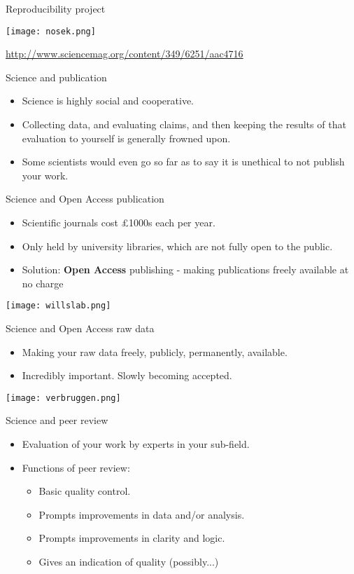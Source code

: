 \documentclass{beamer}
\begin{document}
\begin{frame}{Reproducibility project}
	\centerline{\texttt{[image: nosek.png]}}
	\url{http://www.sciencemag.org/content/349/6251/aac4716}
\end{frame}

\begin{frame}{Science and publication}
	\begin{itemize}
		\item Science is highly social and cooperative.
		\item Collecting data, and evaluating claims, and then keeping the results of that evaluation to yourself is generally frowned upon.
		\item Some scientists would even go so far as to say it is unethical to not publish your work. 
	\end{itemize}
\end{frame}

\begin{frame}{Science and Open Access publication}
	\begin{itemize}
		\item Scientific journals cost \pounds 1000s each per year.
		\item Only held by university libraries, which are not fully open to the public.
		\item Solution: \textbf{Open Access} publishing - making publications freely available at no charge
	\end{itemize}
	\centerline{\texttt{[image: willslab.png]}}
\end{frame}

\begin{frame}{Science and Open Access raw data}
	\begin{itemize}
		\item Making your raw data freely, publicly, permanently, available.
		\item Incredibly important. Slowly becoming accepted.
	\end{itemize}
	\centerline{\texttt{[image: verbruggen.png]}}
\end{frame}

\begin{frame}{Science and peer review}
	\begin{itemize}
		\item Evaluation of your work by experts in your sub-field.
		\item Functions of peer review:
		\begin{itemize}
			\item Basic quality control.
			\item Prompts improvements in data and/or analysis.
			\item Prompts improvements in clarity and logic.
			\item Gives an indication of quality (possibly...)
		\end{itemize}
	\end{itemize}
\end{frame}
\end{document}
